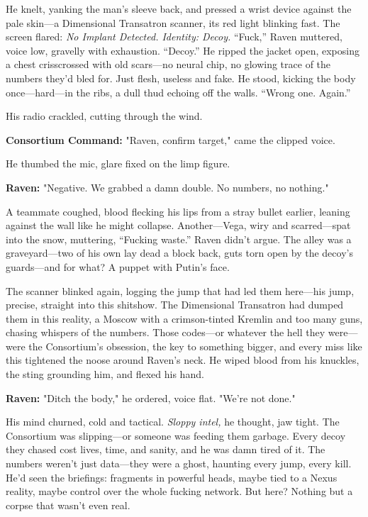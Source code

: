 \documentclass[12pt]{book}
\begin{document}
He knelt, yanking the man’s sleeve back, and pressed a wrist device against the pale skin—a Dimensional Transatron scanner, its red light blinking fast. The screen flared: \textit{No Implant Detected. Identity: Decoy.} “Fuck,” Raven muttered, voice low, gravelly with exhaustion. “Decoy.” He ripped the jacket open, exposing a chest crisscrossed with old scars—no neural chip, no glowing trace of the numbers they’d bled for. Just flesh, useless and fake. He stood, kicking the body once—hard—in the ribs, a dull thud echoing off the walls. “Wrong one. Again.”

His radio crackled, cutting through the wind.

\vspace{0.5em}
\textbf{Consortium Command:} "Raven, confirm target," came the clipped voice.

He thumbed the mic, glare fixed on the limp figure.

\vspace{0.5em}
\textbf{Raven:} "Negative. We grabbed a damn double. No numbers, no nothing."

A teammate coughed, blood flecking his lips from a stray bullet earlier, leaning against the wall like he might collapse. Another—Vega, wiry and scarred—spat into the snow, muttering, “Fucking waste.” Raven didn’t argue. The alley was a graveyard—two of his own lay dead a block back, guts torn open by the decoy’s guards—and for what? A puppet with Putin’s face.

The scanner blinked again, logging the jump that had led them here—his jump, precise, straight into this shitshow. The Dimensional Transatron had dumped them in this reality, a Moscow with a crimson-tinted Kremlin and too many guns, chasing whispers of the numbers. Those codes—or whatever the hell they were—were the Consortium’s obsession, the key to something bigger, and every miss like this tightened the noose around Raven’s neck. He wiped blood from his knuckles, the sting grounding him, and flexed his hand.

\vspace{0.5em}
\textbf{Raven:} "Ditch the body," he ordered, voice flat. "We’re not done."

His mind churned, cold and tactical. \textit{Sloppy intel,} he thought, jaw tight. The Consortium was slipping—or someone was feeding them garbage. Every decoy they chased cost lives, time, and sanity, and he was damn tired of it. The numbers weren’t just data—they were a ghost, haunting every jump, every kill. He’d seen the briefings: fragments in powerful heads, maybe tied to a Nexus reality, maybe control over the whole fucking network. But here? Nothing but a corpse that wasn’t even real.
\end{document}
